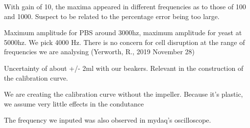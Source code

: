 With gain of 10, the maxima appeared in different frequencies as to those of 100 and 1000. Suspect to be related to the percentage error being too large.

Maximum amplitude for PBS around 3000hz, maximum amplitude for yeast at 5000hz. We pick 4000 Hz.
There is no concern for cell disruption at the range of frequencies we are analysing (Yerworth, R., 2019 November 28)

Uncertainty of about +/- 2ml with our beakers. Relevant in the construction of the calibration curve.

We are creating the calibration curve without the impeller. Because it's plastic, we assume very little effects in the condutance

The frequency we inputed was also observed in mydaq's oscilloscope. 